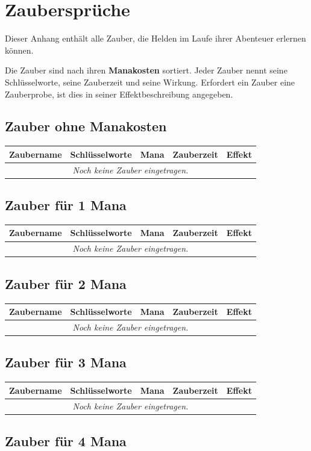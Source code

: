 \chapter{Zaubersprüche}

Dieser Anhang enthält alle Zauber, die Helden im Laufe ihrer Abenteuer erlernen können.

Die Zauber sind nach ihren \textbf{Manakosten} sortiert. Jeder Zauber nennt seine Schlüsselworte, seine Zauberzeit und seine Wirkung. Erfordert ein Zauber eine Zauberprobe, ist dies in seiner Effektbeschreibung angegeben.

\newcommand{\zaubertabelle}{%
\begin{center}
\renewcommand{\arraystretch}{1.25}
\begin{tabularx}{\textwidth}{|p{2.8cm}|p{3.0cm}|>{\centering\arraybackslash}p{1.0cm}|p{2.5cm}|X|}
\hline
\textbf{Zaubername} & \textbf{Schlüsselworte} & \textbf{Mana} & \textbf{Zauberzeit} & \textbf{Effekt} \\
\hline
\multicolumn{5}{|c|}{\emph{Noch keine Zauber eingetragen.}} \\
\hline
\end{tabularx}
\end{center}%
}

\section{Zauber ohne Manakosten}

\zaubertabelle

\section{Zauber für 1 Mana}

\zaubertabelle

\section{Zauber für 2 Mana}

\zaubertabelle

\section{Zauber für 3 Mana}

\zaubertabelle

\section{Zauber für 4 Mana}

